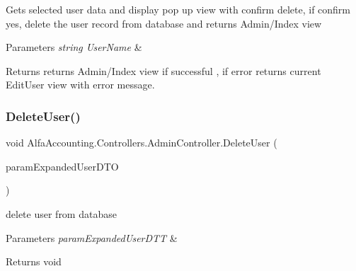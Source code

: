 Gets selected user data and display pop up view with confirm delete, if confirm yes, delete the user record from database and returns Admin/\+Index view 


\begin{DoxyParams}{Parameters}
{\em string User\+Name} & \\
\hline
\end{DoxyParams}
\begin{DoxyReturn}{Returns}
returns Admin/\+Index view if successful , if error returns current Edit\+User view with error message. 
\end{DoxyReturn}
\mbox{\label{class_alfa_accounting_1_1_controllers_1_1_admin_controller_a655bceb6a08f850821d527726e8412e1}} 
\subsubsection{\texorpdfstring{Delete\+User()}{DeleteUser()}\hspace{0.1cm}{\footnotesize\ttfamily [2/2]}}
{\footnotesize\ttfamily void Alfa\+Accounting.\+Controllers.\+Admin\+Controller.\+Delete\+User (\begin{DoxyParamCaption}\item[{Expanded\+User\+D\+TO}]{param\+Expanded\+User\+D\+TO }\end{DoxyParamCaption})\hspace{0.3cm}{\ttfamily [private]}}



delete user from database 


\begin{DoxyParams}{Parameters}
{\em param\+Expanded\+User\+D\+TT} & \\
\hline
\end{DoxyParams}
\begin{DoxyReturn}{Returns}
void
\end{DoxyReturn}
\mbox{\label{class_alfa_accounting_1_1_controllers_1_1_admin_controller_affbab160f6a2b99cf1caa77c57ac0bd3}} 
